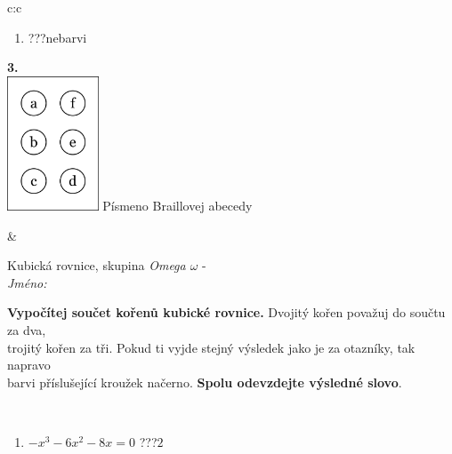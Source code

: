 \documentclass[10pt]{report}
\begin{document}
\begin{tabular}{c:c}
\begin{minipage}[c][104.5mm][t]{0.5\linewidth}
\begin{center}
\begin{minipage}{0.79\linewidth}
\begin{center}
\begin{varwidth}{\linewidth}
\begin{enumerate}
\item \quad \dotfill\; ???\;\dotfill \quad nebarvi
\end{enumerate}
\end{varwidth}
\end{center}
\end{minipage}
\begin{minipage}{0.20\linewidth}
\begin{center}
{\Huge\bfseries 3.} \\[2mm]
\includegraphics[height=40mm]{../images/braille.png}
{\small Písmeno Braillovej abecedy}
\end{center}
\end{minipage}
\end{center}
\end{minipage}
&
\begin{minipage}[c][104.5mm][t]{0.5\linewidth}
\begin{center}
\vspace{7mm}
{\huge Kubická rovnice, skupina \textit{Omega $\omega$} -}\\[5mm]
\textit{Jméno:}\phantom{xxxxxxxxxxxxxxxxxxxxxxxxxxxxxxxxxxxxxxxxxxxxxxxxxxxxxxxxxxxxxxxxx}\\[5mm]
\begin{minipage}{0.95\linewidth}
\begin{center}
\textbf{Vypočítej součet kořenů kubické rovnice.} Dvojitý kořen považuj do součtu za dva,\\trojitý kořen za tři. Pokud ti vyjde stejný výsledek jako je za otazníky, tak napravo\\barvi příslušející kroužek načerno. \textbf{Spolu odevzdejte výsledné slovo}.
\end{center}
\end{minipage}
\\[1mm]
\begin{minipage}{0.79\linewidth}
\begin{center}
\begin{varwidth}{\linewidth}
\begin{enumerate}
\Large
\item $-x^3-6x^2-8x=0$\quad \dotfill\; ???\;\dotfill \quad $2$

\end{enumerate}
\end{varwidth}
\end{center}
\end{minipage}
\end{center}
\end{minipage}
\end{tabular}
\end{document}
